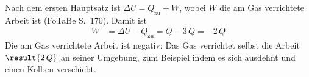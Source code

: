 Nach dem ersten Hauptsatz ist $\Delta U = Q_\text{zu} + W$, wobei $W$ die am Gas verrichtete Arbeit ist (FoTaBe S.~170). Damit ist
\begin{align}
 W &= \Delta U - Q_\text{zu} = Q - 3\,Q = -2\,Q
\end{align}
Die am Gas verrichtete Arbeit ist negativ: Das Gas verrichtet selbst die Arbeit $\result{2\,Q}$ an seiner Umgebung, zum Beispiel indem es sich ausdehnt und einen Kolben verschiebt.
